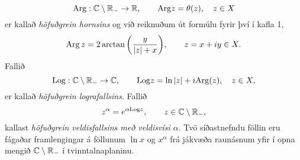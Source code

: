  $${\operatorname{Arg}} :{\mathbb C}\setminus {\mathbb R}_-\to {\mathbb R}, \qquad
{\operatorname{Arg}} z=\theta(z),\quad z\in X
 $$
er kallað {\it höfuðgrein
hornsins} og 
við reiknuðum út formúlu fyrir því í kafla 1,
$$
{\operatorname{Arg}}\, z=2\arctan\bigg(\dfrac y{|z|+x}\bigg), \qquad z=x+iy\in X. 
$$
Fallið
 $${\operatorname{Log}} :{\mathbb C}\setminus {\mathbb R}_-\to {\mathbb C}, \qquad
{\operatorname{Log}} z=\ln |z| +i{\operatorname{Arg}}(z),\quad z\in X,
 $$
er kallað {\it höfuðgrein
lografallsins}.  Fallið 
 $$z^\alpha = e^{\alpha{\operatorname{Log}} z}, \qquad z\in {\mathbb C}\setminus {\mathbb R}_-,
 $$
kallast {\it höfuðgrein
veldisfallsins með
veldisvísi $\alpha$}. Tvö síðastnefndu föllin eru fágaðar framlengingar á föllunum
$\ln x$  og $x^\alpha$ frá jákvæða raunásnum  yfir
í opna mengið ${\mathbb C}\setminus {\mathbb R}_-$ í tvinntalnaplaninu.

